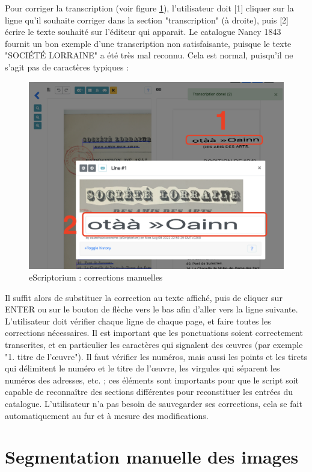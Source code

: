 \documentclass[a4paper,12pt,twoside]{book}
\begin{document}
Pour corriger la transcription (voir figure \ref{corriger}), l'utilisateur doit [1] cliquer sur la ligne qu'il souhaite corriger dans la section "transcription" (à droite), puis [2] écrire le texte souhaité sur l'éditeur qui apparait. Le catalogue Nancy 1843 fournit un bon exemple d'une transcription non satisfaisante, puisque le texte "SOCIÉTÉ LORRAINE" a été très mal reconnu. Cela est normal, puisqu'il ne s'agit pas de caractères typiques :
\begin{figure}[ht]
	\centering
	\includegraphics[scale=0.3]{corriger_eScriptorium.png}		
	\caption{eScriptorium : corrections manuelles}
	\label{corriger}
\end{figure}

Il suffit alors de substituer la correction au texte affiché, puis de  cliquer sur ENTER ou sur le bouton de flèche vers le bas afin d'aller vers la ligne suivante. L'utilisateur doit vérifier chaque ligne de chaque page, et faire toutes les corrections nécessaires. Il est important que les ponctuations soient correctement transcrites, et en particulier les caractères qui signalent des œuvres (par exemple "1. titre de l'œuvre"). Il faut vérifier les numéros, mais aussi les points et les tirets qui délimitent le numéro et le titre de l'œuvre, les virgules qui séparent les numéros des adresses, etc. ; ces éléments sont importants pour que le script soit capable de reconnaître des sections différentes pour reconstituer les entrées du catalogue. L'utilisateur n'a pas besoin de sauvegarder ses corrections, cela se fait automatiquement au fur et à mesure des modifications.

\section{Segmentation manuelle des images}
\end{document}
